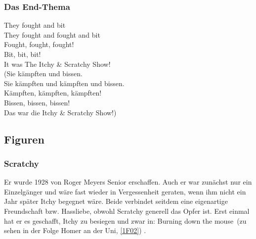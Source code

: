 \begin{appendix}
\subsubsection{Das End-Thema}

\begin{lyricquote}
	  They fought and bit\\
		They fought and fought and bit\\
		Fought, fought, fought!\\
		Bit, bit, bit!\\
		It was The Itchy \& Scratchy Show!\\

    (Sie kämpften und bissen.\\
    Sie kämpften und kämpften und bissen.\\
    Kämpften, kämpften, kämpften!\\
    Bissen, bissen, bissen!\\
    Das war die Itchy \& Scratchy Show!) 
\end{lyricquote}


\subsection{Figuren}

\subsubsection{Scratchy}
Er wurde 1928 von Roger Meyers Senior erschaffen. Auch er war zunächst nur ein Einzelgänger und wäre fast wieder in Vergessenheit geraten, wenn ihm nicht ein Jahr später Itchy begegnet wäre. Beide verbindet seitdem eine eigenartige Freundschaft bzw. Hassliebe, obwohl Scratchy generell das Opfer ist. Erst einmal hat er es geschafft, Itchy zu besiegen und zwar in: \glqq Burning down the mouse\grqq\ (zu sehen in der Folge \glqq Homer an der Uni\grqq , \ref{1F02}) \cite{itchy}.



\end{appendix}
